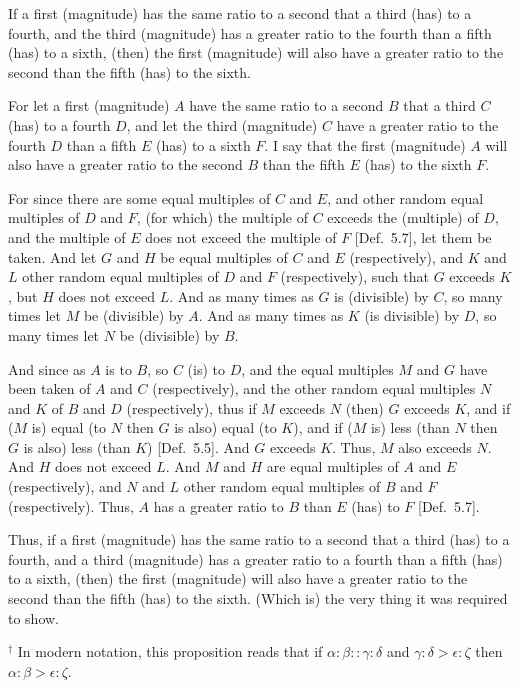 \begin{Parallel}{}{}
{If a first (magnitude) has the same ratio to a second that a third (has) to a fourth, and the third (magnitude) has a greater ratio to the fourth than a fifth (has) to a sixth, (then) the first (magnitude) will also have a greater ratio to the
second  than the fifth (has) to the sixth.

\epsfysize=0.65in
\centerline{}

For let a first (magnitude) $A$ have the same ratio to a second $B$ that a
third $C$ (has) to a fourth $D$, and let the third (magnitude) $C$ have a
greater ratio to the fourth $D$  than a fifth $E$ (has) to a sixth $F$. I say that the first (magnitude) $A$
will also have a greater ratio to the second $B$ than the fifth $E$ (has) to the
sixth $F$.

For since there are some equal multiples of $C$ and $E$, and other random equal multiples of $D$ and $F$, (for which) the multiple of $C$ exceeds the (multiple) of $D$, 
and the multiple of $E$ does not exceed the multiple of $F$ [Def.~5.7], let them be taken. And let
$G$ and $H$ be equal multiples of $C$ and $E$ (respectively), and $K$ and $L$
other random equal multiples of $D$ and $F$ (respectively), such that 
$G$ exceeds $K$, but $H$ does not exceed $L$. And as many times as $G$ is (divisible)
by $C$, so many times let $M$ be (divisible) by $A$. And as many times as
$K$ (is divisible) by $D$, so many times let $N$ be (divisible) by $B$.

And since as $A$ is to $B$, so $C$ (is) to $D$, and the equal multiples $M$ and $G$
have been taken of $A$ and $C$ (respectively), and the other random equal
multiples $N$ and $K$ of $B$ and $D$ (respectively), thus if $M$ exceeds $N$ (then)
$G$ exceeds $K$, and if ($M$ is) equal (to $N$ then $G$ is also) equal (to $K$),
and if ($M$ is) less (than $N$ then $G$ is also) less (than $K$) [Def.~5.5]. And $G$ exceeds $K$. Thus, $M$ also exceeds $N$.
And $H$ does not exceed $L$. And $M$ and $H$ are equal multiples of
$A$ and $E$ (respectively), and $N$ and $L$ other random equal multiples of $B$ and $F$
(respectively).  Thus, $A$ has a greater ratio to $B$ than $E$ (has) to $F$  [Def.~5.7].

Thus, if a first (magnitude) has the same ratio to a second  that a third (has) to a fourth, and a third (magnitude) has a greater ratio to a fourth than a fifth (has) to a sixth, (then) the first (magnitude) will also have a greater ratio to the
second than the fifth (has) to the sixth. (Which is)
the very thing it was required to show.}
\end{Parallel}
{\footnotesize \noindent$^\dag$ In modern notation, this proposition
reads that if $\alpha:\beta::\gamma:\delta$ and $\gamma:\delta > \epsilon:\zeta$ then $\alpha:\beta>\epsilon:\zeta$.}

